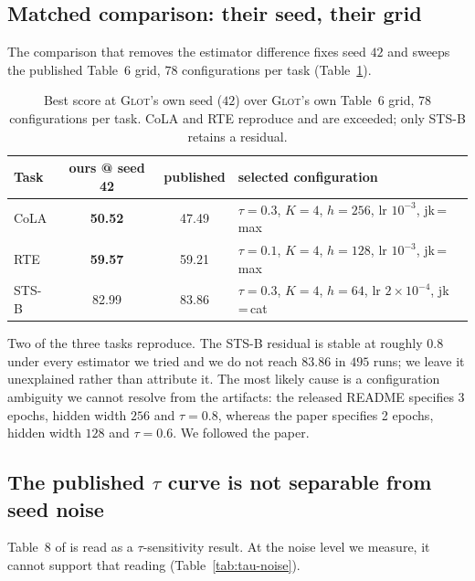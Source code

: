 \documentclass{article} %
\begin{document}
\subsection{Matched comparison: their seed, their grid}

The comparison that removes the estimator difference fixes seed $42$ and sweeps
the published Table~6 grid, $78$ configurations per task
(Table~\ref{tab:seed42}).

\begin{table}[t]
\caption{Best score at \textsc{Glot}'s own seed ($42$) over \textsc{Glot}'s own
Table~6 grid, $78$ configurations per task. CoLA and RTE reproduce and are
exceeded; only STS-B retains a residual.}
\label{tab:seed42}
\begin{center}
\begin{tabular}{lccl}
\toprule
Task & ours @ seed 42 & published & selected configuration \\
\midrule
CoLA  & \textbf{50.52} & 47.49 & $\tau{=}0.3$, $K{=}4$, $h{=}256$, lr $10^{-3}$, jk\,=\,max \\
RTE   & \textbf{59.57} & 59.21 & $\tau{=}0.1$, $K{=}4$, $h{=}128$, lr $10^{-3}$, jk\,=\,max \\
STS-B & 82.99          & 83.86 & $\tau{=}0.3$, $K{=}4$, $h{=}64$, lr $2\times10^{-4}$, jk\,=\,cat \\
\bottomrule
\end{tabular}
\end{center}
\end{table}

Two of the three tasks reproduce. The STS-B residual is stable at roughly
$0.8$ under every estimator we tried and we do not reach $83.86$ in $495$ runs;
we leave it unexplained rather than attribute it. The most likely cause is a
configuration ambiguity we cannot resolve from the artifacts: the released
README specifies 3 epochs, hidden width $256$ and $\tau=0.8$, whereas the paper
specifies 2 epochs, hidden width $128$ and $\tau=0.6$. We followed the paper.

\subsection{The published \texorpdfstring{$\tau$}{tau} curve is not separable
from seed noise}
\label{sec:tau-noise}

Table~8 of \citet{mantri2026glot} is read as a $\tau$-sensitivity result. At
the noise level we measure, it cannot support that reading
(Table~\ref{tab:tau-noise}).
\end{document}
